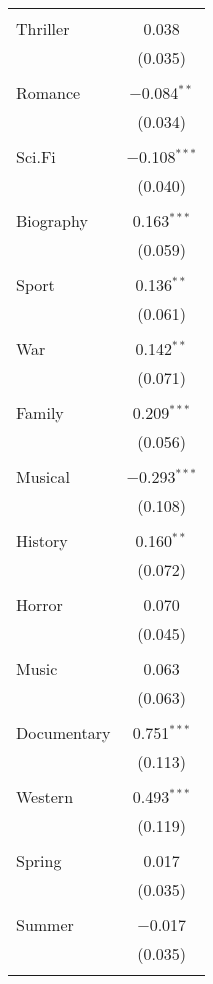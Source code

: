 \begin{table}[!htbp]
\begin{tabular}{@{\extracolsep{5pt}}lc}
  & \\ 
 Thriller & 0.038 \\ 
  & (0.035) \\ 
  & \\ 
 Romance & $-$0.084$^{**}$ \\ 
  & (0.034) \\ 
  & \\ 
 Sci.Fi & $-$0.108$^{***}$ \\ 
  & (0.040) \\ 
  & \\ 
 Biography & 0.163$^{***}$ \\ 
  & (0.059) \\ 
  & \\ 
 Sport & 0.136$^{**}$ \\ 
  & (0.061) \\ 
  & \\ 
 War & 0.142$^{**}$ \\ 
  & (0.071) \\ 
  & \\ 
 Family & 0.209$^{***}$ \\ 
  & (0.056) \\ 
  & \\ 
 Musical & $-$0.293$^{***}$ \\ 
  & (0.108) \\ 
  & \\ 
 History & 0.160$^{**}$ \\ 
  & (0.072) \\ 
  & \\ 
 Horror & 0.070 \\ 
  & (0.045) \\ 
  & \\ 
 Music & 0.063 \\ 
  & (0.063) \\ 
  & \\ 
 Documentary & 0.751$^{***}$ \\ 
  & (0.113) \\ 
  & \\ 
 Western & 0.493$^{***}$ \\ 
  & (0.119) \\ 
  & \\ 
 Spring & 0.017 \\ 
  & (0.035) \\ 
  & \\ 
 Summer & $-$0.017 \\ 
  & (0.035) \\ 
  & \\ 

\end{tabular}
\end{table}

